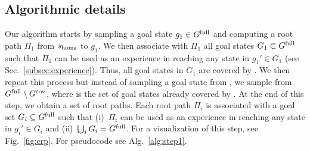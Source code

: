 \documentclass[conference]{IEEEtran}
\begin{document}




\subsection{Algorithmic details}
Our algorithm starts by sampling a goal state $g_1 \in G^{\textrm{full}}$ and computing a root path $\Pi_1$ from $s_{\textrm{home}}$ to $g_1$. We then associate with $\Pi_1$ all goal states $G_1 \subset G^{\textrm{full}}$ such that $\Pi_1$ can be used as an experience in reaching any state in $g_1' \in G_1$ (see Sec.~\ref{subsec:experience}).
Thus, all goal states in $G_1$ are covered by \Shome.
%
We then repeat this process but instead of sampling  a goal state from \Gfull, we sample from $G^{\textrm{full}} \setminus G^{\textrm{cov}}$, where \Gcov is the set of goal states already covered by \Shome.
At the end of this step, we obtain a set of root paths. 
Each root path $\Pi_i$ is associated with a goal set $G_i \subseteq G^{\textrm{full}}$ such that 
(i)~$\Pi_i$ can be used as an experience in reaching any state in $g_i' \in G_i$ and 
(ii)~$\bigcup_i G_i = G^{\textrm{full}}$.
%
For a visualization of this step, see Fig.~\ref{fig:crp}.
For pseudocode see Alg.~\ref{alg:step1}.
\end{document}
